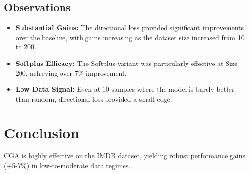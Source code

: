 \documentclass{article}
\begin{document}
\subsection{Observations}
\begin{itemize}
    \item \textbf{Substantial Gains:} The directional loss provided significant improvements over the baseline, with gains increasing as the dataset size increased from 10 to 200.
    \item \textbf{Softplus Efficacy:} The Softplus variant was particularly effective at Size 200, achieving over 7\% improvement.
    \item \textbf{Low Data Signal:} Even at 10 samples where the model is barely better than random, directional loss provided a small edge.
\end{itemize}

\section{Conclusion}
CGA is highly effective on the IMDB dataset, yielding robust performance gains (+5-7\%) in low-to-moderate data regimes.
\end{document}
